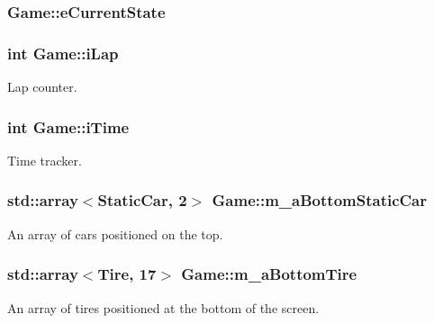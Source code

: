\subsubsection[{\texorpdfstring{e\+Current\+State}{eCurrentState}}]{ Game\+::e\+Current\+State\hspace{0.3cm}{\ttfamily [private]}}\hypertarget{class_game_ae0322dfc4abedec88046d09ca3460f35}{}\label{class_game_ae0322dfc4abedec88046d09ca3460f35}
\subsubsection[{\texorpdfstring{i\+Lap}{iLap}}]{\setlength{\rightskip}{0pt plus 5cm}int Game\+::i\+Lap\hspace{0.3cm}{\ttfamily [private]}}\hypertarget{class_game_a67d656a5608c3cd5cd3df69932bb16fb}{}\label{class_game_a67d656a5608c3cd5cd3df69932bb16fb}
Lap counter. 
\subsubsection[{\texorpdfstring{i\+Time}{iTime}}]{\setlength{\rightskip}{0pt plus 5cm}int Game\+::i\+Time\hspace{0.3cm}{\ttfamily [private]}}\hypertarget{class_game_a377116aa9d1b98c95fc42f593bfefc33}{}\label{class_game_a377116aa9d1b98c95fc42f593bfefc33}
Time tracker. 
\subsubsection[{\texorpdfstring{m\+\_\+a\+Bottom\+Static\+Car}{m_aBottomStaticCar}}]{\setlength{\rightskip}{0pt plus 5cm}std\+::array$<${\bf Static\+Car}, 2$>$ Game\+::m\+\_\+a\+Bottom\+Static\+Car\hspace{0.3cm}{\ttfamily [private]}}\hypertarget{class_game_a0af48a2f04c50bfcb3d961dbd1a48332}{}\label{class_game_a0af48a2f04c50bfcb3d961dbd1a48332}
An array of cars positioned on the top. 
\subsubsection[{\texorpdfstring{m\+\_\+a\+Bottom\+Tire}{m_aBottomTire}}]{\setlength{\rightskip}{0pt plus 5cm}std\+::array$<${\bf Tire}, 17$>$ Game\+::m\+\_\+a\+Bottom\+Tire\hspace{0.3cm}{\ttfamily [private]}}\hypertarget{class_game_a15992ccedd036df35c2e8c14b70676ef}{}\label{class_game_a15992ccedd036df35c2e8c14b70676ef}
An array of tires positioned at the bottom of the screen. 
